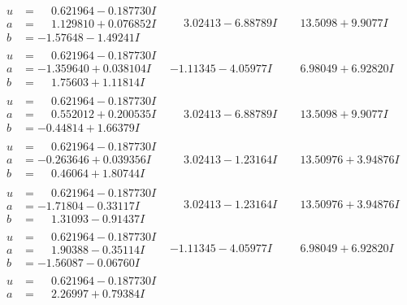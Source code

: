 \documentclass[1p]{elsarticle_modified}
\theoremstyle{definition}
\begin{document}
$$\begin{array}{c|c|c}
\begin{aligned}
u &= \phantom{-}0.621964 - 0.187730 I \\
a &= \phantom{-}1.129810 + 0.076852 I \\
b &= -1.57648 - 1.49241 I\end{aligned}
 & \phantom{-}3.02413 - 6.88789 I & \phantom{-}13.5098 + 9.9077 I \\ \hline\begin{aligned}
u &= \phantom{-}0.621964 - 0.187730 I \\
a &= -1.359640 + 0.038104 I \\
b &= \phantom{-}1.75603 + 1.11814 I\end{aligned}
 & -1.11345 - 4.05977 I & \phantom{-}6.98049 + 6.92820 I \\ \hline\begin{aligned}
u &= \phantom{-}0.621964 - 0.187730 I \\
a &= \phantom{-}0.552012 + 0.200535 I \\
b &= -0.44814 + 1.66379 I\end{aligned}
 & \phantom{-}3.02413 - 6.88789 I & \phantom{-}13.5098 + 9.9077 I \\ \hline\begin{aligned}
u &= \phantom{-}0.621964 - 0.187730 I \\
a &= -0.263646 + 0.039356 I \\
b &= \phantom{-}0.46064 + 1.80744 I\end{aligned}
 & \phantom{-}3.02413 - 1.23164 I & \phantom{-}13.50976 + 3.94876 I \\ \hline\begin{aligned}
u &= \phantom{-}0.621964 - 0.187730 I \\
a &= -1.71804 - 0.33117 I \\
b &= \phantom{-}1.31093 - 0.91437 I\end{aligned}
 & \phantom{-}3.02413 - 1.23164 I & \phantom{-}13.50976 + 3.94876 I \\ \hline\begin{aligned}
u &= \phantom{-}0.621964 - 0.187730 I \\
a &= \phantom{-}1.90388 - 0.35114 I \\
b &= -1.56087 - 0.06760 I\end{aligned}
 & -1.11345 - 4.05977 I & \phantom{-}6.98049 + 6.92820 I \\ \hline\begin{aligned}
u &= \phantom{-}0.621964 - 0.187730 I \\
a &= \phantom{-}2.26997 + 0.79384 I \\

\end{aligned}
\end{array}$$
\end{document}
